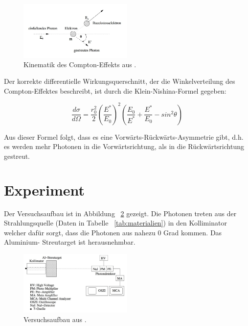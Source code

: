 \documentclass[aps,twocolumn,secnumarabic,nobalancelastpage,amsmath,amssymb,
nofootinbib,superscriptaddress]{revtex4-1}
\begin{document}
\begin{figure}[h]
  \centering
  \includegraphics[width=0.5\textwidth]{comptstreu_schema.jpg}
  \caption{\label{fig:kinematik} Kinematik des Compton-Effekts aus \cite{skript07}.}
\end{figure}

Der korrekte differentielle Wirkungsquerschnitt, der die Winkelverteilung des
Compton-Effektes beschreibt, ist durch die Klein-Nishina-Formel gegeben:

  \begin{equation}
    \frac{d \sigma}{d \Omega} = \frac{r_0^2}{2} \left( \frac{E^*}{E_0} \right)^2
    \left( \frac{E_0}{E^*} + \frac{E^*}{E_0} - sin^2 \theta    \right)
    \label{eq:kleinnishina}
  \end{equation}

Aus dieser Formel folgt, dass es eine Vorwärts-Rückwärts-Asymmetrie gibt, d.h.
es werden mehr Photonen in die Vorwärtsrichtung, als in die Rückwärtsrichtung
gestreut.


\section{Experiment}
Der Versuchsaufbau ist in Abbildung ~\ref{fig:aufbau} gezeigt. Die Photonen treten
aus der Strahlungsquelle (Daten in Tabelle ~\ref{tab:materialien}) in den Kolliminator
welcher dafür sorgt, dass die Photonen aus nahezu 0 Grad kommen. Das Aluminium-
Streutarget ist herausnehmbar.

\begin{figure}[h]
  \centering
  \includegraphics[width=0.5\textwidth]{aufbau.jpeg}
  \caption{\label{fig:aufbau} Versuchsaufbau aus \cite{skript07}.}
\end{figure}
\end{document}
